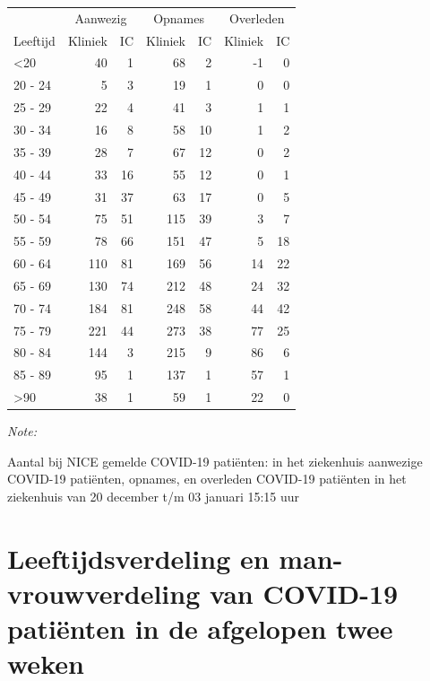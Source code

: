 \documentclass[
  english,
  man,floatsintext]{apa6}
\begin{document}
\begin{table}
\centering\begingroup\fontsize{10}{12}\selectfont

\begin{threeparttable}
\begin{tabular}{lrrrrrr}
\toprule
\multicolumn{1}{c}{ } & \multicolumn{2}{c}{Aanwezig} & \multicolumn{2}{c}{Opnames} & \multicolumn{2}{c}{Overleden} \\
\cmidrule(l{3pt}r{3pt}){2-3} \cmidrule(l{3pt}r{3pt}){4-5} \cmidrule(l{3pt}r{3pt}){6-7}
Leeftijd & Kliniek & IC & Kliniek & IC & Kliniek & IC\\
\midrule
<20 & 40 & 1 & 68 & 2 & -1 & 0\\
20 - 24 & 5 & 3 & 19 & 1 & 0 & 0\\
25 - 29 & 22 & 4 & 41 & 3 & 1 & 1\\
30 - 34 & 16 & 8 & 58 & 10 & 1 & 2\\
35 - 39 & 28 & 7 & 67 & 12 & 0 & 2\\
40 - 44 & 33 & 16 & 55 & 12 & 0 & 1\\
45 - 49 & 31 & 37 & 63 & 17 & 0 & 5\\
50 - 54 & 75 & 51 & 115 & 39 & 3 & 7\\
55 - 59 & 78 & 66 & 151 & 47 & 5 & 18\\
60 - 64 & 110 & 81 & 169 & 56 & 14 & 22\\
65 - 69 & 130 & 74 & 212 & 48 & 24 & 32\\
70 - 74 & 184 & 81 & 248 & 58 & 44 & 42\\
75 - 79 & 221 & 44 & 273 & 38 & 77 & 25\\
80 - 84 & 144 & 3 & 215 & 9 & 86 & 6\\
85 - 89 & 95 & 1 & 137 & 1 & 57 & 1\\
>90 & 38 & 1 & 59 & 1 & 22 & 0\\
\bottomrule
\end{tabular}
\begin{tablenotes}
\item \textit{Note: } 
\item Aantal bij NICE gemelde COVID-19 patiënten: in het ziekenhuis aanwezige COVID-19 patiënten, opnames, en overleden COVID-19 patiënten in het ziekenhuis van 20 december t/m 03 januari 15:15 uur
\end{tablenotes}
\end{threeparttable}
\endgroup{}
\end{table}

\newpage

\hypertarget{leeftijdsverdeling-en-man-vrouwverdeling-van-covid-19-patiuxebnten-in-de-afgelopen-twee-weken}{%
\section{Leeftijdsverdeling en man-vrouwverdeling van COVID-19 patiënten in de afgelopen twee weken}\label{leeftijdsverdeling-en-man-vrouwverdeling-van-covid-19-patiuxebnten-in-de-afgelopen-twee-weken}}
\end{document}
